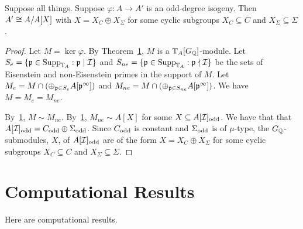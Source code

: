 \documentclass[thesis.tex]{subfiles}
\begin{document}
\begin{corollary}
    Suppose all things. Suppose $\varphi:A\to A'$ is an odd-degree isogeny.
    Then $A'\cong A/A[X]$ with $X=X_C\oplus X_\Sigma$ for some cyclic subgroups
    $X_C\subseteq C$ and $X_\Sigma\subseteq \Sigma$.
\end{corollary}
\begin{proof}
    Let $M=\ker\varphi$. By Theorem~\ref{}, $M$ is a $\mathbb{T}_A[G_{\mathbb{Q}}]$-module. Let
    $S_e = \{\mathfrak{p} \in \operatorname{Supp}_{\mathbb{T}_A}: \mathfrak{p} \mid \mathcal{I}\}$ and $S_{ne} = \{\mathfrak{p} \in
    \operatorname{Supp}_{\mathbb{T}_A}: \mathfrak{p} \nmid \mathcal{I}\}$ be the sets of Eisenstein and non-Eisenstein
    primes in the support of $M$. Let $M_e = M \cap (\oplus_{\mathfrak{p} \in S_e}
    A[\mathfrak{p}^\infty])$ and $M_{ne} = M\cap (\oplus_{\mathfrak{p} \in S_{ne}} A[\mathfrak{p}^\infty])$.
    We have $M = M_e = M_{ne}$.

    By~\ref{}, $M\sim M_{ne}$. By~\ref{}, $M_{ne}\sim A[X]$ for some
    $X\subseteq A[\mathcal{I}]_{\mathrm{odd}}$. We have that that $A[\mathcal{I}]_{\mathrm{odd}} = C_{\mathrm{odd}}\oplus
    \Sigma_{\mathrm{odd}}$. Since $C_{\mathrm{odd}}$ is constant and $\Sigma_{\mathrm{odd}}$ is of
    $\mu$-type, the $G_{\mathbb{Q}}$-submodules, $X$, of $A[\mathcal{I}]_{\mathrm{odd}}$ are of the form 
    $X=X_C\oplus X_\Sigma$ for some cyclic subgroups
    $X_C\subseteq C$ and $X_\Sigma\subseteq \Sigma$.
\end{proof}

\section{Computational Results}

Here are computational results.
\end{document}
